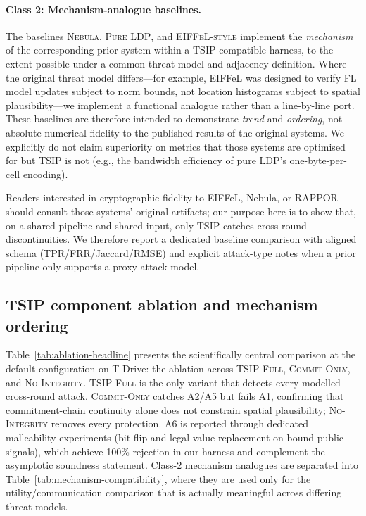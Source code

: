 \documentclass[conference]{IEEEtran}
\theoremstyle{definition}
\theoremstyle{plain}
\begin{document}
\paragraph{Class 2: Mechanism-analogue baselines.}
The baselines \textsc{Nebula}, \textsc{Pure LDP}, and \textsc{EIFFeL-style}
implement the \emph{mechanism} of the corresponding prior system within a
TSIP-compatible harness, to the extent possible under a common threat
model and adjacency definition.
Where the original threat model differs---for example, EIFFeL was
designed to verify FL model updates subject to norm bounds, not location
histograms subject to spatial plausibility---we implement a functional
analogue rather than a line-by-line port. These baselines are therefore
intended to demonstrate \emph{trend} and \emph{ordering}, not absolute
numerical fidelity to the published results of the original systems. We
explicitly do not claim superiority on metrics that those systems are
optimised for but \textsc{TSIP} is not (e.g., the bandwidth efficiency
of pure LDP's one-byte-per-cell encoding).

Readers interested in cryptographic fidelity to EIFFeL, Nebula, or
RAPPOR should consult those systems' original artifacts; our purpose
here is to show that, on a shared pipeline and shared input, only
\textsc{TSIP} catches cross-round discontinuities.
We therefore report a dedicated baseline comparison with aligned schema
(TPR/FRR/Jaccard/RMSE) and explicit attack-type notes when a prior
pipeline only supports a proxy attack model.

\subsection{TSIP component ablation and mechanism ordering}
\label{sec:eval-headline}

Table~\ref{tab:ablation-headline} presents the scientifically central
comparison at the default configuration on T-Drive: the ablation across
\textsc{TSIP-Full}, \textsc{Commit-Only}, and \textsc{No-Integrity}.
\textsc{TSIP-Full} is the only variant that detects every modelled
cross-round attack. \textsc{Commit-Only} catches A2/A5 but fails A1,
confirming that commitment-chain continuity alone does not constrain
spatial plausibility; \textsc{No-Integrity} removes every protection.
A6 is reported through dedicated malleability experiments
(bit-flip and legal-value replacement on bound public signals),
which achieve 100\% rejection in our harness and complement the
asymptotic soundness statement. Class-2 mechanism
analogues are separated into Table~\ref{tab:mechanism-compatibility},
where they are used only for the utility/communication comparison that is
actually meaningful across differing threat models.
\end{document}
